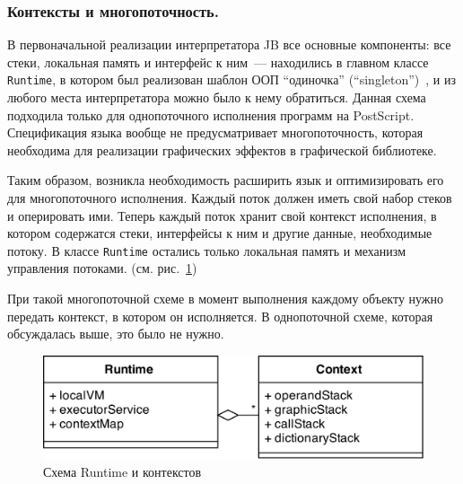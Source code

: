 	\subsubsection*{Контексты и многопоточность.}
	В первоначальной реализации интерпретатора JB все основные компоненты: все стеки, локальная память и интерфейс к ним~--- находились в главном классе \texttt{Runtime}, в котором был реализован шаблон ООП ``одиночка'' (``singleton'')~\cite{patterns}, и из любого места интерпретатора можно было к нему обратиться. Данная схема подходила только для однопоточного исполнения программ на PostScript. Спецификация языка вообще не предусматривает многопоточность, которая необходима для реализации графических эффектов в графической библиотеке.
		
	Таким образом, возникла необходимость расширить язык и оптимизировать его для многопоточного исполнения. Каждый поток должен иметь свой набор стеков и оперировать ими. Теперь каждый поток хранит свой контекст исполнения, в котором  содержатся стеки, интерфейсы к ним и другие данные, необходимые потоку. В классе \texttt{Runtime}  остались только локальная память и механизм управления потоками. (см. рис.~\ref{UML_runtime_contexts}) 
		
	При такой многопоточной схеме в момент выполнения  каждому объекту нужно передать контекст, в котором он исполняется. В однопоточной схеме, которая обсуждалась выше, это было не нужно.
		
		
	\begin{figure} [h]
			\includegraphics[width=\linewidth]{Pozdin/UML_Runtime_Context.png}
			\caption{Схема Runtime и контекстов}\label{UML_runtime_contexts}
	\end{figure}
		
